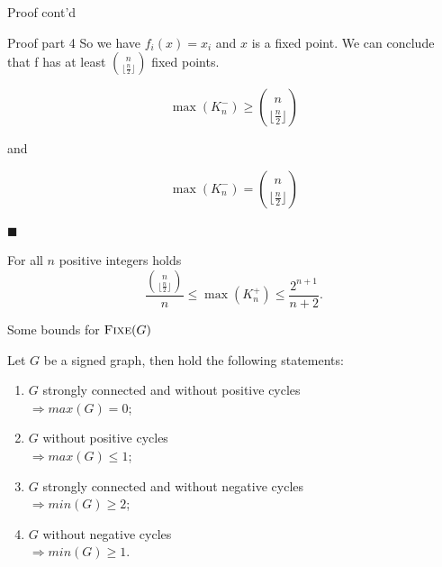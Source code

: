 \documentclass{beamer}
\newcommand{\floor}[1]{\lfloor #1 \rfloor}
\begin{document}
\begin{frame}{Proof cont'd}
\justifying
\begin{block} {Proof part 4}
    So we have $f_i(x) = x_i$ and $x$ is a fixed point. We can conclude that f has at least $\binom{n}{\floor{\frac{n}{2}}}$ fixed points.
    
    \[
        \max(K_n^-) \geq \binom{n}{\floor{\frac{n}{2}}}
    \]
    
    
    and 
    
    \[
        \max(K_n^-) = \binom{n}{\floor{\frac{n}{2}}}
    \]
    
    \hfill $\blacksquare$
\end{block}
\end{frame}
    

\begin{frame}
\justifying
    \begin{theorem}[$\max(K_n^+)$]
        For all $n$ positive integers holds 
        \[
            \frac{\binom{n}{\floor{\frac{n}{2}}}}{n} \leq \max(K_n^+) \leq 
            \frac{2^{n+1}}{n+2}.
        \]
    \end{theorem}
\end{frame}

\begin{frame}{Some bounds for $\textsc{Fixe}(G)$}
\justifying
    \begin{theorem}[Aracena 2008]
        Let $G$ be a signed graph, then hold the following statements:
        \begin{enumerate}
            \item $G$ strongly connected and without {\color{teal} positive cycles} \\
            \quad$\Rightarrow max(G) = 0$;
            \item $G$ without {\color{teal} positive cycles} \\
            \quad$\Rightarrow max(G) \leq 1$;
            \item $G$ strongly connected and without {\color{red} negative cycles} \\
            \quad$\Rightarrow min(G) \geq 2$;
            \item $G$ without {\color{red} negative cycles} \\
            \quad $\Rightarrow min(G) \geq 1$.
        \end{enumerate}
    \end{theorem}
\end{frame}
\end{document}
